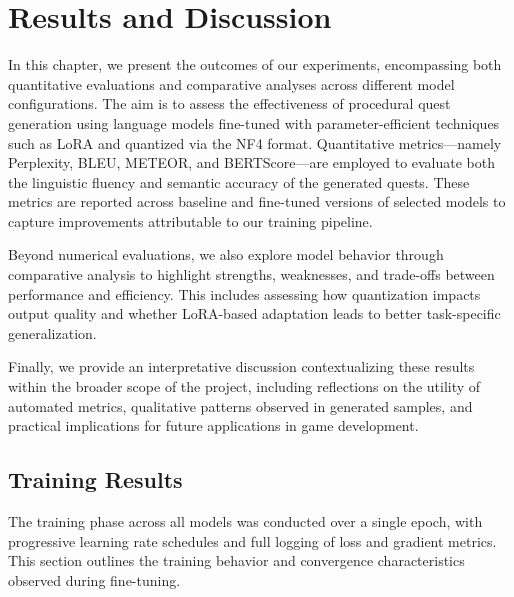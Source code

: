 \clearpage

\chapter{Results and Discussion}

In this chapter, we present the outcomes of our experiments, encompassing both quantitative
evaluations and comparative analyses across different model configurations. The aim
is to assess the effectiveness of procedural quest generation using language models fine-tuned
with parameter-efficient techniques such as LoRA and quantized via the NF4 format.
Quantitative metrics—namely Perplexity, BLEU, METEOR, and BERTScore—are
employed to evaluate both the linguistic fluency and semantic accuracy of the generated
quests. These metrics are reported across baseline and fine-tuned versions of selected
models to capture improvements attributable to our training pipeline.

Beyond numerical evaluations, we also explore model behavior through comparative
analysis to highlight strengths, weaknesses, and trade-offs between performance and efficiency.
This includes assessing how quantization impacts output quality and whether
LoRA-based adaptation leads to better task-specific generalization.

Finally, we provide an interpretative discussion contextualizing these results within
the broader scope of the project, including reflections on the utility of automated metrics,
qualitative patterns observed in generated samples, and practical implications for future
applications in game development.

\section{Training Results}

The training phase across all models was conducted over a single epoch, with progressive
learning rate schedules and full logging of loss and gradient metrics. This section outlines
the training behavior and convergence characteristics observed during fine-tuning.

